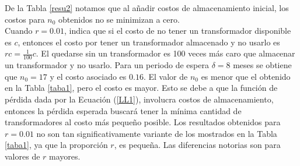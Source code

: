 \noindent De la Tabla  \ref{resu2} notamos que al a\~nadir costos de almacenamiento inicial, los costos para $n_0$ obtenidos no se minimizan a cero.\\[0.1cm]
\noindent Cuando $r=0.01$, indica que si el costo de no tener un transformador disponible es $c$, entonces el costo por tener un transformador almacenado y no usarlo es $rc=\displaystyle\frac{1}{100}c$. El quedarse sin un transformador es 100 veces m\'as caro que almacenar un transformador y no usarlo. Para un periodo de espera $\delta=8$ meses se obtiene que  $n_0=17$ y el costo asociado es $0.16$. El valor de $n_0$ es menor que el obtenido en la Tabla \ref{taba1}, pero el costo es mayor. Esto se debe a que la funci\'on de p\'erdida dada por la Ecuaci\'on (\ref{LL1}), involucra costos de almacenamiento, entonces la p\'erdida esperada buscar\'a tener la m\'inima cantidad de transformadores al costo m\'as peque\~no posible. Los resultados obtenidos para $r=0.01$ no son tan significativamente variante de los mostrados en la Tabla \ref{taba1}, ya que la proporci\'on $r$, es peque\~na. Las diferencias notorias son para valores de $r$ mayores.\\[0.1cm]

